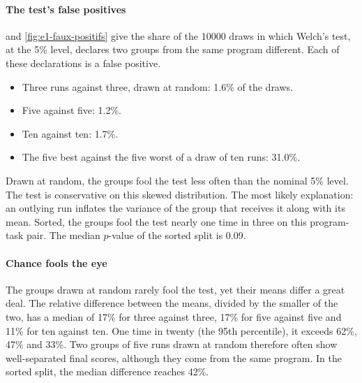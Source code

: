 \paragraph{The test's false positives}
 and \cref{fig:e1-faux-positifs} give the share of the \num{10000} draws in which Welch's test,
at the 5\% level, declares two groups from the same program different. Each of these declarations is a false
positive.
\begin{itemize}
  \item Three runs against three, drawn at random: 1.6\% of the draws.
  \item Five against five: 1.2\%.
  \item Ten against ten: 1.7\%.
  \item The five best against the five worst of a draw of ten runs: 31.0\%.
\end{itemize}
Drawn at random, the groups fool the test less often than the nominal 5\% level. The test is conservative on
this skewed distribution. The most likely explanation: an outlying run inflates the variance of the group
that receives it along with its mean. Sorted, the groups fool the test nearly one time in three on this program-task pair.
The median $p$-value of the sorted split is 0.09.



\paragraph{Chance fools the eye}
The groups drawn at random rarely fool the test, yet their means differ a great deal. The relative difference
between the means, divided by the smaller of the two, has a median of 17\% for three against three, 17\% for
five against five and 11\% for ten against ten. One time in twenty (the 95th percentile), it exceeds 62\%, 47\%
and 33\%. Two groups of five runs drawn at random therefore often show well-separated final scores, although
they come from the same program. In the sorted split, the median difference reaches 42\%.

